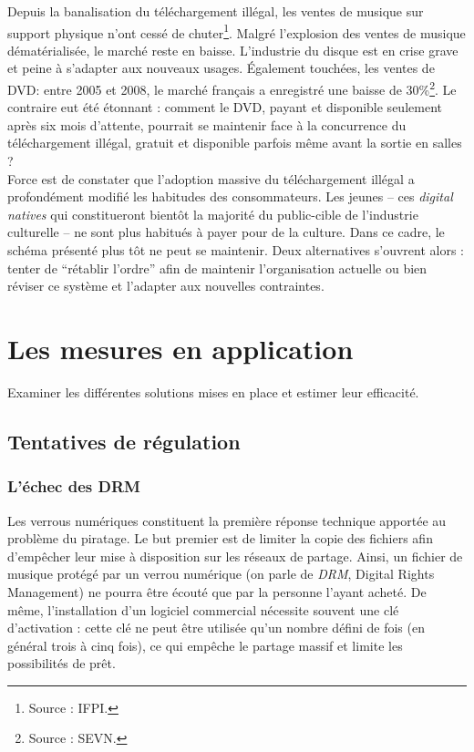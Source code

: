 \documentclass[a4paper]{report}
\begin{document}
	Depuis la banalisation du téléchargement illégal, les ventes de musique sur support physique n'ont cessé de chuter\footnote{Source : IFPI.}. Malgré l'explosion des ventes de musique dématérialisée, le marché reste en baisse. L'industrie du disque est en crise grave et peine à s'adapter aux nouveaux usages. 
	Également touchées, les ventes de DVD: entre 2005 et 2008, le marché français a enregistré une baisse de 30\%\footnote{Source : SEVN.}. Le contraire eut été étonnant : comment le DVD, payant et disponible seulement après six mois d'attente, pourrait se maintenir face à la concurrence du téléchargement illégal, gratuit et disponible parfois même avant la sortie en salles ?\\

	Force est de constater que l'adoption massive du téléchargement illégal a profondément modifié les habitudes des consommateurs. Les jeunes – ces \emph{digital natives} qui constitueront bientôt la majorité du public-cible de l'industrie culturelle – ne sont plus habitués à payer pour de la culture. Dans ce cadre, le schéma présenté plus tôt ne peut se maintenir. Deux alternatives s'ouvrent alors : tenter de ``rétablir l'ordre'' afin de maintenir l'organisation actuelle ou bien réviser ce système et l'adapter aux nouvelles contraintes.





	\chapter{Les mesures en application}
	Examiner les différentes solutions mises en place et estimer leur efficacité.

	\section{Tentatives de régulation}

		\subsection{L'échec des DRM}
		Les verrous numériques constituent la première réponse technique apportée au problème du piratage. Le but premier est de limiter la copie des fichiers afin d'empêcher leur mise à disposition sur les réseaux de partage. Ainsi, un fichier de musique protégé par un verrou numérique (on parle de \emph{DRM}, Digital Rights Management) ne pourra être écouté que par la personne l'ayant acheté. De même, l'installation d'un logiciel commercial nécessite souvent une clé d'activation : cette clé ne peut être utilisée qu'un nombre défini de fois (en général trois à cinq fois), ce qui empêche le partage massif et limite les possibilités de prêt.\\
\end{document}
